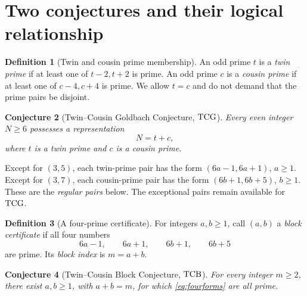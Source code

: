 \documentclass[11pt,a4paper]{article}
\numberwithin{equation}{section}
\newtheorem{conjecture}{Conjecture}[section]
\theoremstyle{definition}
\newtheorem{definition}[conjecture]{Definition}
\newcommand{\TCG}{\textup{TCG}}
\newcommand{\TCB}{\textup{TCB}}
\begin{document}
\section{Two conjectures and their logical relationship}
\begin{definition}[Twin and cousin prime membership]
An odd prime \(t\) is a \emph{twin prime} if at least one of \(t-2,t+2\) is prime. An odd prime \(c\) is a \emph{cousin prime} if at least one of \(c-4,c+4\) is prime. We allow \(t=c\) and do not demand that the prime pairs be disjoint.
\end{definition}
\begin{conjecture}[Twin--Cousin Goldbach Conjecture, \(\TCG\)]\label{conj:tcg}
Every even integer \(N\ge6\) possesses a representation
\begin{equation}\label{eq:tcg}
N=t+c,
\end{equation}
where \(t\) is a twin prime and \(c\) is a cousin prime.
\end{conjecture}

Except for \((3,5)\), each twin-prime pair has the form \((6a-1,6a+1)\), \(a\ge1\). Except for \((3,7)\), each cousin-prime pair has the form \((6b+1,6b+5)\), \(b\ge1\). These are the \emph{regular pairs} below. The exceptional pairs remain available for \(\TCG\).

\begin{definition}[A four-prime certificate]
For integers \(a,b\ge1\), call \((a,b)\) a \emph{block certificate} if all four numbers
\begin{equation}\label{eq:fourforms}
6a-1,\qquad 6a+1,\qquad 6b+1,\qquad 6b+5
\end{equation}
are prime. Its \emph{block index} is \(m=a+b\).
\end{definition}
\begin{conjecture}[Twin--Cousin Block Conjecture, \(\TCB\)]\label{conj:tcb}
For every integer \(m\ge2\), there exist \(a,b\ge1\), with \(a+b=m\), for which \eqref{eq:fourforms} are all prime.
\end{conjecture}
\end{document}
